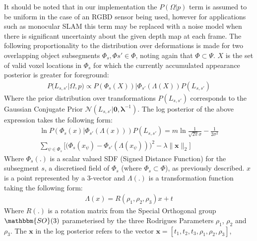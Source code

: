 It should be noted that in our implementation the $P(\Omega | p)$ term is assumed to be uniform in the case of an 
RGBD sensor being used, however for applications such as monocular SLAM this term may be replaced with a noise model when there is 
significant uncertainty about the given depth map at each frame.
The following proportionality to the distribution over deformations is made for two overlapping object subsegments $\Phi_{s}, \Phi{s'} \in \Phi$, noting again that 
$\Phi \subset \Psi$. $X$ is the set of valid voxel locations in $\Phi_{s}$ for which the currently accumulated appearance posterior is greater for foreground:
\begin{equation}
\begin{split}
P(L_{s, s'} | \Omega, p) \propto P(\Phi_{s}(X)) | \Phi_{s'}(\Lambda(X))P(L_{s, s'})
\end{split}
\end{equation}
Where the prior distribution over transformations $P(L_{s, s'})$ corresponds to the Gaussian Conjugate Prior $\mathcal{N}(L_{s, s'} | \mathbf{0}, \mathbf{\lambda}^{-1})$.
The log posterior of the above expression takes the following form:
\begin{equation}
\label{eq:logPosterior}
\begin{split}
\ln P(\Phi_{s}(x) | \Phi_{s'}(\Lambda(x)))P(L_{s, s'}) = m\ln\frac{1}{\sqrt{2\pi}\sigma} -\frac{1}{2\sigma^2} \\ 
\sum_{\psi \in \Phi_{s}} \Bigg [ \bigg( \Phi_{s}(x_{\psi}) - \Phi_{s'}(\Lambda(x_{\psi})) \bigg)^2  - \lambda \lVert \mathbf{\mathbf{x}} \rVert_{2} \Bigg ]
\end{split}
\end{equation}
Where $\Phi_{s}(.)$ is a scalar valued SDF (Signed Distance Function) for the subsegment $s$, a discretised field of $\Phi_{s}$ (where $\Phi_{s} \subset \Phi$), as previously described. $x$ is a point represented by a 3-vector and $\Lambda(.)$ is a transformation function taking the following form:
\begin{equation}
\begin{split}
\Lambda(x) = R(\rho_{1}, \rho_{2}, \rho_{3})x + t
\end{split}
\end{equation}
Where $R(.)$ is a rotation matrix from the Special Orthogonal group $\mathbbm{SO}(3)$ parameterised by the three 
Rodrigues Parameters \cite{Shuster1993} $\rho_{1}$, $\rho_{2}$ and $\rho_{3}$. The $\mathbf{x}$ in the log posterior refers to the vector $\mathbf{x} = [t_{1}, t_{2}, t_{3}, \rho_{1}, \rho_{2}, \rho_{3}]$, 
